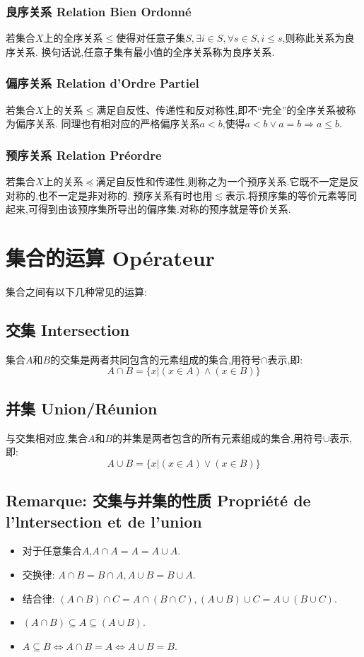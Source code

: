 \documentclass[12pt, a4paper, oneside]{ctexbook}
\begin{document}
  \subsubsection{良序关系 Relation Bien Ordonné}
  若集合$X$上的全序关系$\leq$使得对任意子集$S,\exists i\in S,\forall s\in S,i\leq s$,则称此关系为良序关系.
  换句话说,任意子集有最小值的全序关系称为良序关系.

  \subsubsection{偏序关系 Relation d'Ordre Partiel}
  若集合$X$上的关系$\leq$满足自反性、传递性和反对称性,即不“完全”的全序关系被称为偏序关系.
  同理也有相对应的严格偏序关系$a<b$,使得$a<b\lor a=b\Rightarrow a\leq b$.
  \subsubsection{预序关系 Relation Préordre}
  若集合$X$上的关系$\preceq $满足自反性和传递性,则称之为一个预序关系.它既不一定是反对称的,也不一定是非对称的.
  预序关系有时也用$\lesssim $表示.将预序集的等价元素等同起来,可得到由该预序集所导出的偏序集.对称的预序就是等价关系.

\section{集合的运算 Opérateur}
  集合之间有以下几种常见的运算:
  \subsection{交集 Intersection}
  集合$A$和$B$的交集是两者共同包含的元素组成的集合,用符号$\cap$表示,即:
  $$
  A\cap B=\{x | (x\in A)\land (x\in B)\}
  $$


  \subsection{并集 Union/Réunion}
  与交集相对应,集合$A$和$B$的并集是两者包含的所有元素组成的集合,用符号$\cup$表示,即:
  $$
  A\cup B=\{x | (x\in A)\lor (x\in B)\}
  $$

  \subsection{Remarque: 交集与并集的性质 Propriété de l'lntersection et de l'union}
  \begin{itemize}
    \item 对于任意集合$A$,$A\cap A=A=A\cup A$.
    \item 交换律: $A\cap B=B\cap A,A\cup B=B\cup A$.
    \item 结合律: $(A\cap B)\cap C=A\cap (B\cap C),(A\cup B)\cup C=A\cup (B\cup C)$.
    \item $(A\cap B)\subseteq A\subseteq (A\cup B).$
    \item $A\subseteq B\Leftrightarrow A\cap B=A\Leftrightarrow A\cup B=B$.
  \end{itemize}
\end{document}
